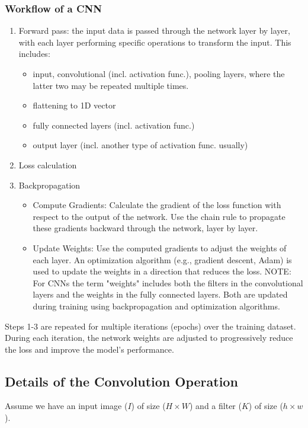 \documentclass{article}
\begin{document}
\subsubsection{Workflow of a CNN}
\begin{enumerate}
    \item Forward pass:  the input data is passed through the network layer by layer, with each layer performing specific operations to transform the input. This includes: 
    \begin{itemize}
        \item input, convolutional (incl. activation func.), pooling layers, where the latter two may be repeated multiple times.
        \item flattening to 1D vector 
        \item fully connected layers (incl. activation func.)
        \item output layer (incl. another type of activation func. usually)
    \end{itemize}
    \item Loss calculation
    \item Backpropagation
    \begin{itemize}
        \item Compute Gradients: Calculate the gradient of the loss function with respect to the output of the network. Use the chain rule to propagate these gradients backward through the network, layer by layer.
        \item Update Weights: Use the computed gradients to adjust the weights of each layer. An optimization algorithm (e.g., gradient descent, Adam) is used to update the weights in a direction that reduces the loss. NOTE: For CNNs the term "weights" includes both the filters in the convolutional layers and the weights in the fully connected layers. Both are updated during training using backpropagation and optimization algorithms.
    \end{itemize}
\end{enumerate}
%
Steps 1-3 are repeated for multiple iterations (epochs) over the training dataset.
During each iteration, the network weights are adjusted to progressively reduce the loss and improve the model's performance.

\subsection{Details of the Convolution Operation}

Assume we have an input image ($I$) of size ($H \times W$) and a filter ($K$) of size ($h \times w$).
\end{document}

